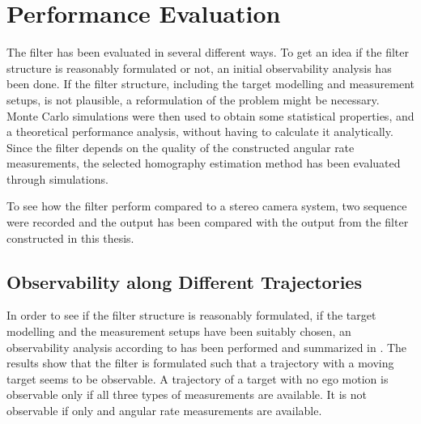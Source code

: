 \chapter{Performance Evaluation}
\label{cha:result}
The filter has been evaluated in several different ways.
To get an idea if the filter structure is reasonably formulated or not, an initial observability analysis has been done.
If the filter structure, including the target modelling and measurement setups, is not plausible, a reformulation of the problem might be necessary.
Monte Carlo simulations were then used to obtain some statistical properties, and a theoretical performance analysis, without having to calculate it analytically.
Since the filter depends on the quality of the constructed angular rate measurements, the selected homography estimation method has been evaluated through simulations.

To see how the filter perform compared to a stereo camera system, two sequence were recorded and the output has been compared with the output from the filter constructed in this thesis.

\section{Observability along Different Trajectories}
\label{sec:observabilityresult}
In order to see if the filter structure is reasonably formulated, \ie if the target modelling and the measurement setups have been suitably chosen, an observability analysis according to  has been performed and summarized in .
The results show that the filter is formulated such that a trajectory with a moving target seems to be observable.
A trajectory of a target with no ego motion is observable only if all three types of measurements are available.
It is not observable if only \abbrROI and angular rate measurements are available.


